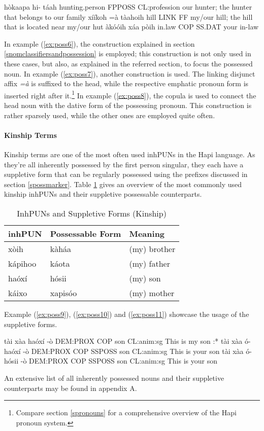 \documentclass[a4paper, 12pt, oneside]{memoir}
\newcommand{\emh}[1]{\textit{#1}}
\begin{document}
\begin{examples}
\ex 
\label{ex:poss6}
\bits hòkaapa hi- táah
\gloss hunting.person FPPOSS CL:profession
\tr our hunter; the hunter that belongs to our family
\ex
\label{ex:poss7}
\bits xííkoh =à tàahoih
\gloss hill LINK FF
\tr my/our hill; the hill that is located near my/our hut
\ex
\label{ex:poss8}
\bits àkóóih xáa pòih
\gloss in.law COP SS.DAT
\tr your in-law
\end{examples}
In example (\ref{ex:poss6}), the construction explained in section \ref{snomclassifiersandpossession} is employed; this construction is not only used in these cases, but also, as explained in the referred section, to focus the possessed noun. In example (\ref{ex:poss7}), another construction is used. The linking disjunct affix \emh{=à} is suffixed to the head, while the respective emphatic pronoun form is inserted right after it.\footnote{Compare section \ref{spronouns} for a comprehensive overview of the Hapi pronoun system.}
In example (\ref{ex:poss8}), the copula is used to connect the head noun with the dative form of the possessing pronoun. This construction is rather sparsely used, while the other ones are employed quite often. 
\paragraph{Kinship Terms}
Kinship terms are one of the most often used inhPUNs in the Hapi language. As they're all inherently possessed by the first person singular, they each have a suppletive form that can be regularly possessed using the prefixes discussed in section \ref{spossmarker}. Table \ref{t:kinship} gives an overview of the most commonly used kinship inhPUNs and their suppletive possessable counterparts. 
\begin{table}[H]
\centering
\begin{tabular}{@{}lll@{}}
\toprule
inhPUN & Possessable Form & Meaning \\ \midrule
xòih & kàháa & (my) brother \\
kápihoo & káota & (my) father \\
haóxí & hósii & (my) son \\
káixo & xapisóo & (my) mother \\ \bottomrule
\end{tabular}
\caption{InhPUNs and Suppletive Forms (Kinship)}
\label{t:kinship}
\end{table}
Example (\ref{ex:poss9}), (\ref{ex:poss10}) and (\ref{ex:poss11}) showcase the usage of the suppletive forms. 
\begin{examples}
\ex
\label{ex:poss9}
\bits tài xàa haóxí -ò
\gloss DEM:PROX COP son CL:anim:sg
\tr This is my son
\ex
\label{ex:poss10}
\bits:* tài xàa ó- haóxí -ò
\gloss DEM:PROX COP SSPOSS son CL:anim:sg
\intended This is your son
\ex
\label{ex:poss11}
\bits tài xàa ó- hósii -ò
\gloss DEM:PROX COP SSPOSS son CL:anim:sg
\tr This is your son
\end{examples}
An extensive list of all inherently possessed nouns and their suppletive counterparts may be found in appendix A.
\end{document}

